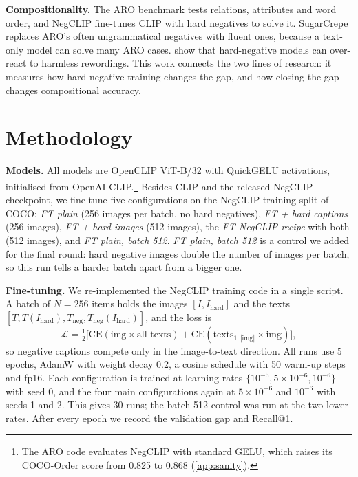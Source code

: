 \documentclass{article}
\begin{document}
\textbf{Compositionality.}
The ARO benchmark \citep{yuksekgonul2023bow} tests relations, attributes and word order, and NegCLIP fine-tunes CLIP with hard negatives to solve it. SugarCrepe \citep{hsieh2023sugarcrepe} replaces ARO's often ungrammatical negatives with fluent ones, because a text-only model can solve many ARO cases. \citet{kamath2024hardpositive} show that hard-negative models can over-react to harmless rewordings. This work connects the two lines of research: it measures how hard-negative training changes the gap, and how closing the gap changes compositional accuracy.

\section{Methodology}
\label{sec:method}

\textbf{Models.}
All models are OpenCLIP ViT-B/32 with QuickGELU activations, initialised from OpenAI CLIP.\footnote{The ARO code evaluates NegCLIP with standard GELU, which raises its COCO-Order score from 0.825 to 0.868 (\cref{app:sanity}).} Besides CLIP and the released NegCLIP checkpoint, we fine-tune five configurations on the NegCLIP training split of COCO: \emph{FT plain} (256 images per batch, no hard negatives), \emph{FT + hard captions} (256 images), \emph{FT + hard images} (512 images), the \emph{FT NegCLIP recipe} with both (512 images), and \emph{FT plain, batch 512}. \emph{FT plain, batch 512} is a control we added for the final round: hard negative images double the number of images per batch, so this run tells a harder batch apart from a bigger one.

\textbf{Fine-tuning.}
We re-implemented the NegCLIP training code in a single script. A batch of $N{=}256$ items holds the images $[I, I_{\text{hard}}]$ and the texts $[T, T(I_{\text{hard}}), T_{\text{neg}}, T_{\text{neg}}(I_{\text{hard}})]$, and the loss is
\begin{equation}
\mathcal{L} = \tfrac{1}{2}\big[\mathrm{CE}(\text{img}\times\text{all texts}) + \mathrm{CE}(\text{texts}_{1:|\text{img}|}\times\text{img})\big],
\label{eq:loss}
\end{equation}
so negative captions compete only in the image-to-text direction. All runs use 5 epochs, AdamW with weight decay 0.2, a cosine schedule with 50 warm-up steps and fp16. Each configuration is trained at learning rates $\{10^{-5}, 5{\times}10^{-6}, 10^{-6}\}$ with seed 0, and the four main configurations again at $5{\times}10^{-6}$ and $10^{-6}$ with seeds 1 and 2. This gives 30 runs; the batch-512 control was run at the two lower rates. After every epoch we record the validation gap and Recall@1.
\end{document}
